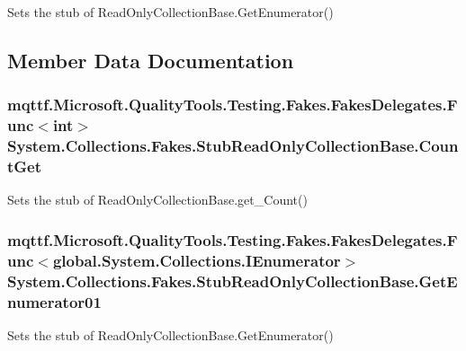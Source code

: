 Sets the stub of Read\-Only\-Collection\-Base.\-Get\-Enumerator()



\subsection{Member Data Documentation}
\hypertarget{class_system_1_1_collections_1_1_fakes_1_1_stub_read_only_collection_base_ae6fe59bffc37861aa12f8541b8305f6d}{
\subsubsection[{Count\-Get}]{\setlength{\rightskip}{0pt plus 5cm}mqttf.\-Microsoft.\-Quality\-Tools.\-Testing.\-Fakes.\-Fakes\-Delegates.\-Func$<$int$>$ System.\-Collections.\-Fakes.\-Stub\-Read\-Only\-Collection\-Base.\-Count\-Get}}\label{class_system_1_1_collections_1_1_fakes_1_1_stub_read_only_collection_base_ae6fe59bffc37861aa12f8541b8305f6d}


Sets the stub of Read\-Only\-Collection\-Base.\-get\-\_\-\-Count()

\hypertarget{class_system_1_1_collections_1_1_fakes_1_1_stub_read_only_collection_base_a213c49a01b0d36b3372da22d7f46cd7d}{
\subsubsection[{Get\-Enumerator01}]{\setlength{\rightskip}{0pt plus 5cm}mqttf.\-Microsoft.\-Quality\-Tools.\-Testing.\-Fakes.\-Fakes\-Delegates.\-Func$<$global.\-System.\-Collections.\-I\-Enumerator$>$ System.\-Collections.\-Fakes.\-Stub\-Read\-Only\-Collection\-Base.\-Get\-Enumerator01}}\label{class_system_1_1_collections_1_1_fakes_1_1_stub_read_only_collection_base_a213c49a01b0d36b3372da22d7f46cd7d}


Sets the stub of Read\-Only\-Collection\-Base.\-Get\-Enumerator()



